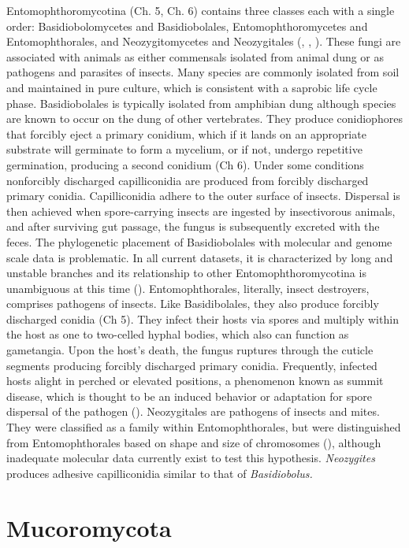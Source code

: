 \documentclass[]{book}
\begin{document}
Entomophthoromycotina (Ch. 5, Ch. 6) contains three classes each with a single order: Basidiobolomycetes and Basidiobolales, Entomophthoromycetes and Entomophthorales, and Neozygitomycetes and Neozygitales (\citet{Humber_2012}, \citet{Benny_2014}, \citet{Spatafora_2016}). These fungi are associated with animals as either commensals isolated from animal dung or as pathogens and parasites of insects. Many species are commonly isolated from soil and maintained in pure culture, which is consistent with a saprobic life cycle phase. Basidiobolales is typically isolated from amphibian dung although species are known to occur on the dung of other vertebrates. They produce conidiophores that forcibly eject a primary conidium, which if it lands on an appropriate substrate will germinate to form a mycelium, or if not, undergo repetitive germination, producing a second conidium (Ch 6). Under some conditions nonforcibly discharged capilliconidia are produced from forcibly discharged primary conidia. Capilliconidia adhere to the outer surface of insects. Dispersal is then achieved when spore-carrying insects are ingested by insectivorous animals, and after surviving gut passage, the fungus is subsequently excreted with the feces. The phylogenetic placement of Basidiobolales with molecular and genome scale data is problematic. In all current datasets, it is characterized by long and unstable branches and its relationship to other Entomophthoromycotina is unambiguous at this time (\citet{Gryganskyi_2012}). Entomophthorales, literally, insect destroyers, comprises pathogens of insects. Like Basidibolales, they also produce forcibly discharged conidia (Ch 5). They infect their hosts via spores and multiply within the host as one to two-celled hyphal bodies, which also can function as gametangia. Upon the host's death, the fungus ruptures through the cuticle segments producing forcibly discharged primary conidia. Frequently, infected hosts alight in perched or elevated positions, a phenomenon known as summit disease, which is thought to be an induced behavior or adaptation for spore dispersal of the pathogen (\citet{Gryganskyi_2017}). Neozygitales are pathogens of insects and mites. They were classified as a family within Entomophthorales, but were distinguished from Entomophthorales based on shape and size of chromosomes (\citet{Humber_2012}), although inadequate molecular data currently exist to test this hypothesis. \emph{Neozygites} produces adhesive capilliconidia similar to that of \emph{Basidiobolus.}

\hypertarget{mucoromycota}{%
\section{Mucoromycota}\label{mucoromycota}}
\end{document}
